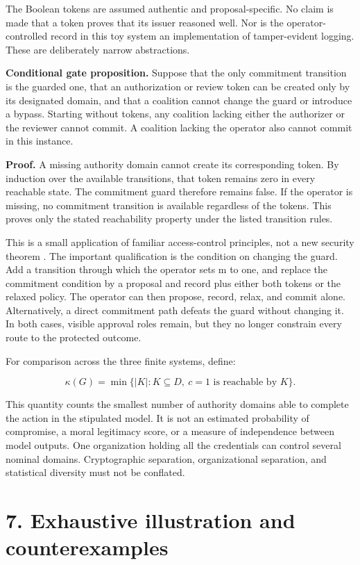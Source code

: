 \documentclass[11pt,a4paper]{article}
\begin{document}
The Boolean tokens are assumed authentic and proposal-specific. No claim is made that a token proves that its issuer reasoned well. Nor is the operator-controlled record in this toy system an implementation of tamper-evident logging. These are deliberately narrow abstractions.

\textbf{Conditional gate proposition.} Suppose that the only commitment transition is the guarded one, that an authorization or review token can be created only by its designated domain, and that a coalition cannot change the guard or introduce a bypass. Starting without tokens, any coalition lacking either the authorizer or the reviewer cannot commit. A coalition lacking the operator also cannot commit in this instance.

\textbf{Proof.} A missing authority domain cannot create its corresponding token. By induction over the available transitions, that token remains zero in every reachable state. The commitment guard therefore remains false. If the operator is missing, no commitment transition is available regardless of the tokens. This proves only the stated reachability property under the listed transition rules.

This is a small application of familiar access-control principles, not a new security theorem \cite{ref-8}. The important qualification is the condition on changing the guard. Add a transition through which the operator sets m to one, and replace the commitment condition by a proposal and record plus either both tokens or the relaxed policy. The operator can then propose, record, relax, and commit alone. Alternatively, a direct commitment path defeats the guard without changing it. In both cases, visible approval roles remain, but they no longer constrain every route to the protected outcome.

For comparison across the three finite systems, define:

\[
\kappa(G)=\min\{|K|:K\subseteq D,\ c=1\text{ is reachable by }K\}.
\]

This quantity counts the smallest number of authority domains able to complete the action in the stipulated model. It is not an estimated probability of compromise, a moral legitimacy score, or a measure of independence between model outputs. One organization holding all the credentials can control several nominal domains. Cryptographic separation, organizational separation, and statistical diversity must not be conflated.

\hypertarget{section-8}{%
\section{7. Exhaustive illustration and counterexamples}\label{section-8}}
\end{document}

